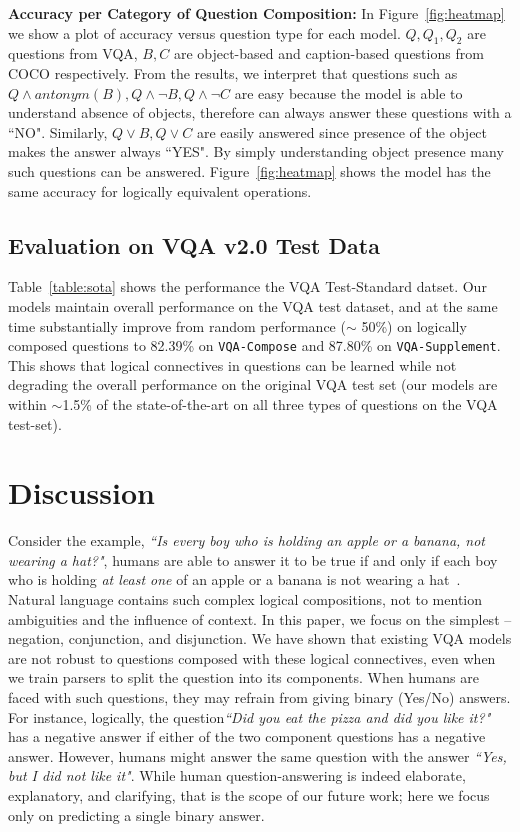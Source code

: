         \noindent\textbf{Accuracy per Category of Question Composition:}
        In Figure~\ref{fig:heatmap} we show a plot of accuracy versus question type for each model.
        $Q, Q_1, Q_2$ are questions from VQA, $B, C$ are object-based and caption-based questions from COCO respectively.
        From the results, we interpret that questions such as $Q\wedge antonym(B), Q\wedge\neg B, Q\wedge\neg C$ are easy because the model is able to understand absence of objects, therefore can always answer these questions with a ``NO".
        Similarly, $ Q\vee B, Q\vee C$ are easily answered since presence of the object makes the answer always ``YES".
        By simply understanding object presence many such questions can be answered. Figure~\ref{fig:heatmap} shows the model has the same accuracy for logically equivalent operations.

    
    \subsection{Evaluation on VQA v2.0 Test Data}
    Table~\ref{table:sota} shows the performance the VQA Test-Standard datset.
    Our models maintain overall performance on the VQA test dataset, and at the same time substantially improve from random performance ($\sim$ 50\%) on logically composed questions to 82.39\% on \texttt{VQA-Compose} and 87.80\% on \texttt{VQA-Supplement}.
    This shows that logical connectives in questions can be learned while not degrading the overall performance on the original VQA test set (our models are within $\sim$1.5\% of the state-of-the-art on all three types of questions on the VQA test-set).
    

\section{Discussion}
Consider the example, {\it ``Is every boy who is holding an apple or a banana, not wearing a hat?"}, humans are able to answer it to be true if and only if each boy who is holding \textit{at least one} of an apple or a banana is not wearing a hat~\citep{arlotti1263}.
Natural language contains such complex logical compositions, not to mention ambiguities and the influence of context.
In this paper, we focus on the simplest -- negation, conjunction, and disjunction.
We have shown that existing VQA models are not robust to questions composed with these logical connectives, even when we train parsers to split the question into its components.
When humans are faced with such questions, they may refrain from giving binary (Yes/No) answers.
For instance, logically, the question{\it ``Did you eat the pizza and did you like it?"} has a negative answer if either of the two component questions has a negative answer.
However, humans might answer the same question with the answer {\it ``Yes, but I did not like it"}.
While human question-answering is indeed elaborate, explanatory, and clarifying, that is the scope of our future work; here we focus only on predicting a single binary answer.

